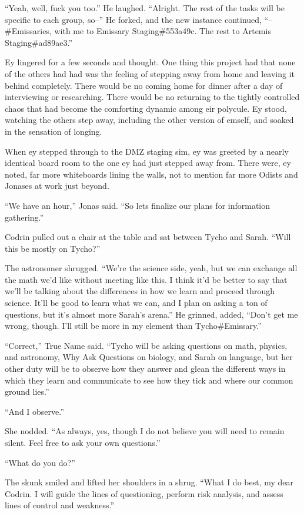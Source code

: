 ``Yeah, well, fuck you too.'' He laughed. ``Alright. The rest of the tasks will be specific to each group, so--'' He forked, and the new instance continued, ``--\#Emissaries, with me to Emissary Staging\#553a49c. The rest to Artemis Staging\#ad89ae3.''

Ey lingered for a few seconds and thought. One thing this project had that none of the others had had was the feeling of stepping away from home and leaving it behind completely. There would be no coming home for dinner after a day of interviewing or researching. There would be no returning to the tightly controlled chaos that had become the comforting dynamic among eir polycule. Ey stood, watching the others step away, including the other version of emself, and soaked in the sensation of longing.

When ey stepped through to the DMZ staging sim, ey was greeted by a nearly identical board room to the one ey had just stepped away from. There were, ey noted, far more whiteboards lining the walls, not to mention far more Odists and Jonases at work just beyond.

``We have an hour,'' Jonas said. ``So lets finalize our plans for information gathering.''

Codrin pulled out a chair at the table and sat between Tycho and Sarah. ``Will this be mostly on Tycho?''

The astronomer shrugged. ``We're the science side, yeah, but we can exchange all the math we'd like without meeting like this. I think it'd be better to say that we'll be talking about the differences in how we learn and proceed through science. It'll be good to learn what we can, and I plan on asking a ton of questions, but it's almost more Sarah's arena.'' He grinned, added, ``Don't get me wrong, though. I'll still be more in my element than Tycho\#Emissary.''

``Correct,'' True Name said. ``Tycho will be asking questions on math, physics, and astronomy, Why Ask Questions on biology, and Sarah on language, but her other duty will be to observe how they answer and glean the different ways in which they learn and communicate to see how they tick and where our common ground lies.''

``And I observe.''

She nodded. ``As always, yes, though I do not believe you will need to remain silent. Feel free to ask your own questions.''

``What do you do?''

The skunk smiled and lifted her shoulders in a shrug. ``What I do best, my dear Codrin. I will guide the lines of questioning, perform risk analysis, and assess lines of control and weakness.''

